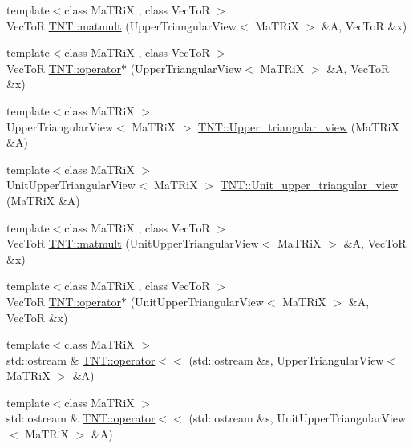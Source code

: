 \begin{DoxyCompactItemize}
{\footnotesize template$<$class MaTRiX , class VecToR $>$ }\\VecToR \hyperlink{namespace_t_n_t_a97afecf249baccab980dcdbbded05383}{TNT::matmult} (UpperTriangularView$<$ MaTRiX $>$ \&A, VecToR \&x)
\item 
{\footnotesize template$<$class MaTRiX , class VecToR $>$ }\\VecToR \hyperlink{namespace_t_n_t_aebcd6d9252089216cd968783fa517ccc}{TNT::operator$\ast$} (UpperTriangularView$<$ MaTRiX $>$ \&A, VecToR \&x)
\item 
{\footnotesize template$<$class MaTRiX $>$ }\\UpperTriangularView$<$ MaTRiX $>$ \hyperlink{namespace_t_n_t_ade864e062e895553747f054a3bccc37f}{TNT::Upper\_\-triangular\_\-view} (MaTRiX \&A)
\item 
{\footnotesize template$<$class MaTRiX $>$ }\\UnitUpperTriangularView$<$ MaTRiX $>$ \hyperlink{namespace_t_n_t_a2462e1f2d5aba69f02cf739ed6d716a1}{TNT::Unit\_\-upper\_\-triangular\_\-view} (MaTRiX \&A)
\item 
{\footnotesize template$<$class MaTRiX , class VecToR $>$ }\\VecToR \hyperlink{namespace_t_n_t_a414ff38d855d929783510c785cdd81c3}{TNT::matmult} (UnitUpperTriangularView$<$ MaTRiX $>$ \&A, VecToR \&x)
\item 
{\footnotesize template$<$class MaTRiX , class VecToR $>$ }\\VecToR \hyperlink{namespace_t_n_t_abb6b4ef7e675d6418dbde44755f1b37a}{TNT::operator$\ast$} (UnitUpperTriangularView$<$ MaTRiX $>$ \&A, VecToR \&x)
\item 
{\footnotesize template$<$class MaTRiX $>$ }\\std::ostream \& \hyperlink{namespace_t_n_t_a1f5a57d566c65a3e1eba0376bf5b71c0}{TNT::operator$<$$<$} (std::ostream \&s, UpperTriangularView$<$ MaTRiX $>$ \&A)
\item 
{\footnotesize template$<$class MaTRiX $>$ }\\std::ostream \& \hyperlink{namespace_t_n_t_abe6b55eb518bd67eb84d782e53fe9def}{TNT::operator$<$$<$} (std::ostream \&s, UnitUpperTriangularView$<$ MaTRiX $>$ \&A)
\end{DoxyCompactItemize}
